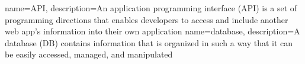 {
        name=API,
        description={An application programming interface (API) is a set of programming directions that enables developers to access and include another web app’s information into their own application}
}
{
        name=database,
        description={A database (DB) contains information that is organized in such a way that it can be easily accessed, managed, and manipulated}
}
